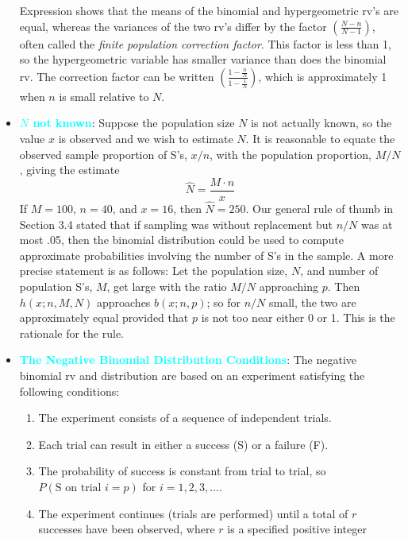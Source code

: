 \documentclass{report}
\begin{document}
\begin{itemize}
        Expression shows that the means of the binomial and hypergeometric rv's are equal, whereas the variances of the two rv's differ by the factor $\left( \frac{N - n}{N - 1} \right)$, often called the \textit{finite population correction factor}. This factor is less than 1, so the
        hypergeometric variable has smaller variance than does the binomial rv. The
        correction factor can be written $\left(\frac{1-\frac{n}{N}}{1-\frac{1}{N}}\right) $, which is approximately 1
        when $n$ is small relative to $N$.
    \item \textbf{\textcolor{cyan}{$N$ not known}}:
        Suppose the population size $N$ is not actually known, so the value $x$ is observed and we wish to estimate $N$. It is reasonable to equate the observed sample proportion of S's, $x/n$, with the population proportion, $M/N$, giving the estimate
        \[
            \hat{N} = \frac{M \cdot n}{x}
        \]
        If $M = 100$, $n = 40$, and $x = 16$, then $\hat{N} = 250$.
        \bigbreak \noindent 
        Our general rule of thumb in Section 3.4 stated that if sampling was without replacement but $n/N$ was at most .05, then the binomial distribution could be used to compute approximate probabilities involving the number of S's in the sample. A more precise statement is as follows: Let the population size, $N$, and number of population S's, $M$, get large with the ratio $M/N$ approaching $p$. Then $h(x; n, M, N)$ approaches $b(x; n, p)$; so for $n/N$ small, the two are approximately equal provided that $p$ is not too near either 0 or 1. This is the rationale for the rule.
    \item \textbf{\textcolor{cyan}{The Negative Binomial Distribution Conditions}}:
        The negative binomial rv and distribution are based on an experiment satisfying the following conditions:
        \begin{enumerate}
            \item The experiment consists of a sequence of independent trials.
            \item Each trial can result in either a success (S) or a failure (F).
            \item The probability of success is constant from trial to trial, so $P(\text{S on trial $i$} = p) $ for $i=1,2,3,... $.
            \item The experiment continues (trials are performed) until a total of $r$ successes have been observed, where $r$ is a specified positive integer
        \end{enumerate}

\end{itemize}
\end{document}
